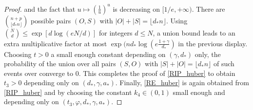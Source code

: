\documentclass[11pt]{amsart}
\numberwithin{equation}{section}
\numberwithin{equation}{section}
\begin{document}
\begin{proof}
    and the fact that $u\mapsto(\frac1u)^u$ is decreasing on $[1/e,+\infty)$.
    There are $\binom{n+p}{\lfloor d_*n\rfloor}$ possible pairs $(O,S)$
    with $|O|+|S|=\lfloor d_*n\rfloor$.
    Using $\binom{N}{d}\le \exp[d\log(eN/d)]$ for integers $d\le N$,
    a union bound leads to an extra multiplicative
    factor at most
    $\exp(n d_*\log(e\frac{1+\gamma}{d_*})$
    in the previous display.
    Choosing $t>0$ a small enough constant depending on
    $(\gamma,d_*)$ only, the probability of the union
    over all pairs $(S,O)$ with $|S|+|O| =\lfloor d_*n \rfloor$
    of such events over converge to 0. This completes the proof
    of \eqref{RIP_huber} to obtain $t_3>0$ depending only
    on $(d_*,\gamma,a_*)$.
    Finally, \eqref{RE_huber} is again obtained from
    \eqref{RIP_huber} and \cite[Lemma 2.7]{lecue2014sparse}
    by choosing the constant $k_4\in (0,1)$ small enough and depending
    only on $(t_3,\varphi,d_*,\gamma,a_*)$.
\end{proof}
\end{document}
